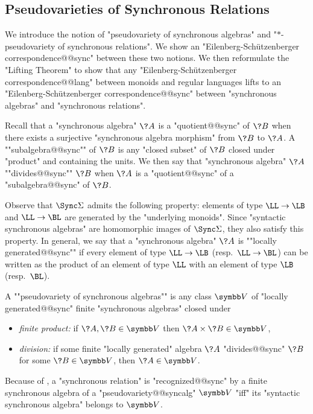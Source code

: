 \subsection{Pseudovarieties of Synchronous Relations}
\label{sec:varieties}

We introduce the notion of "pseudovariety of synchronous algebras" 
and "$\ast$-pseudovariety of synchronous relations". We show an "Eilenberg-Schützenberger correspondence@@sync" between these two notions. We then reformulate the "Lifting Theorem"
to show that any "Eilenberg-Schützenberger correspondence@@lang" between monoids and regular languages
lifts to an "Eilenberg-Schützenberger correspondence@@sync" between "synchronous algebras" and "synchronous relations".

Recall that a "synchronous algebra" $\?A$ is a "quotient@@sync" of $\?B$
when there exists a surjective "synchronous algebra morphism" from $\?B$ to $\?A$.
A ""subalgebra@@sync"" of $\?B$ is any "closed subset" of $\?B$ closed under "product"
and containing the units.
We then say that "synchronous algebra" $\?A$ \AP""divides@@sync"" $\?B$
when $\?A$ is a "quotient@@sync" of a "subalgebra@@sync" of $\?B$.

Observe that $\Sync\Sigma$ admits the following property:
elements of type $\LL\to\LB$ and $\LL\to\BL$ are generated by the "underlying monoids".
Since "syntactic synchronous algebras" are homomorphic images of $\Sync\Sigma$, they also
satisfy this property. In general, we say that a "synchronous algebra" $\?A$ is \AP""locally 
generated@@sync"" if every element of type $\LL\to\LB$ (resp.~$\LL\to\BL$)
can be written as the product of an element of type $\LL$ with an element of type $\LB$ (resp.~$\BL$).

A \AP""pseudovariety of synchronous algebras"" is any class $\B{V}$
of "locally generated@@sync" finite "synchronous algebras" closed under
\begin{itemize}
	\item \emph{finite product:} if $\?A, \?B \in \B{V}$ then $\?A \times \?B \in \B{V}$,
	\item \emph{division:} if some finite "locally generated" algebra $\?A$ "divides@@sync" $\?B$ for some $\?B \in \B{V}$, then $\?A \in \B{V}$.
\end{itemize}

Because of , a "synchronous relation" is "recognized@@sync"
by a finite synchronous algebra of a "pseudovariety@@syncalg" $\B{V}$ "iff"
its "syntactic synchronous algebra" belongs to $\B{V}$.

